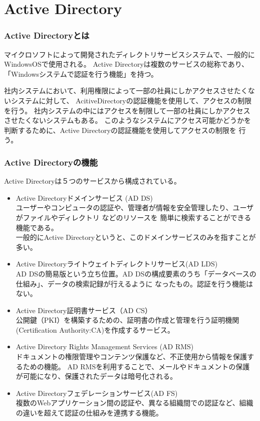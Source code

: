 \documentclass[11pt,a4j,titlepage]{jreport}
\begin{document}
\section{Active Directory}\label{Active Directory}
\subsubsection*{Active Directoryとは}
マイクロソフトによって開発されたディレクトリサービスシステムで、一般的にWindowsOSで使用される。
Active Directoryは複数のサービスの総称であり、「Windowsシステムで認証を行う機能」を持つ。

社内システムにおいて、利用権限によって一部の社員にしかアクセスさせたくないシステムに対して、
AcitiveDirectoryの認証機能を使用して、アクセスの制限を行う。
社内システムの中にはアクセスを制限して一部の社員にしかアクセスさせたくないシステムもある。
このようなシステムにアクセス可能かどうかを判断するために、Active Directoryの認証機能を使用してアクセスの制限を
行う。
\fi
\subsubsection*{Active Directoryの機能}

Active Directoryは５つのサービスから構成されている。

\begin{itemize}

    \item  Active Directoryドメインサービス (AD DS)\mbox{}\\
    ユーザーやコンピュータの認証や、管理者が情報を安全管理したり、ユーザがファイルやディレクトリ などのリソースを
    簡単に検索することができる機能である。\\
    一般的にActive Directoryというと、このドメインサービスのみを指すことが多い。
    
    \item Active Directoryライトウェイトディレクトリサービス(AD LDS)\mbox{}\\
    AD DSの簡易版という立ち位置。AD DSの構成要素のうち「データベースの仕組み」、データの検索記録が行えるように
    なったもの。認証を行う機能はない。

    \item Active Directory証明書サービス（AD CS）\mbox{}\\
    公開鍵（PKI）を構築するための、証明書の作成と管理を行う証明機関(Certification Authority:CA)を作成するサービス。
    
    \item Active Directory Rights Management Services (AD RMS)\mbox{}\\
    ドキュメントの権限管理やコンテンツ保護など、不正使用から情報を保護するための機能。
    AD RMSを利用することで、メールやドキュメントの保護が可能になり、保護されたデータは暗号化される。

    \item Active Directoryフェデレーションサービス(AD FS)\mbox{}\\
    複数のWebアプリケーション間の認証や、異なる組織間での認証など、組織の違いを超えて認証の仕組みを連携する機能。

\end{itemize}
\end{document}
